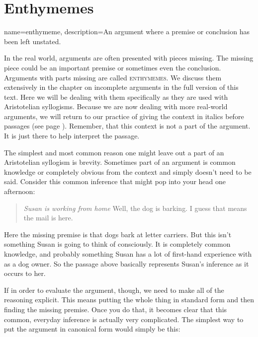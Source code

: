 \section{Enthymemes}

{
name=enthymeme,
description={An argument where a premise or conclusion has been left unstated.}
}


In the real world, arguments are often presented with pieces missing. The missing piece could be an important premise or sometimes even the conclusion.  Arguments with parts missing are called \textsc{\glspl{enthymeme}}. \label{def:enthymeme} We discuss them extensively in the chapter on incomplete arguments in the full version of this text. \label{ver_var}  Here we will be dealing with them specifically as they are used with Aristotelian syllogisms. Because we are now dealing with more real-world arguments, we will return to our practice of giving the context in italics before passages (see page \pageref{context_marker}). Remember, that this context is not a part of the argument. It is just there to help interpret the passage. 

The simplest and most common reason one might leave out a part of an Aristotelian syllogism is brevity. Sometimes part of an argument is common knowledge or completely obvious from the context and simply doesn't need to be said. Consider this common inference that might pop into your head one afternoon:

\begin{quotation} \noindent \textit{Susan is working from home} Well, the dog is barking. I guess that means the mail is here.\end{quotation}

Here the missing premise is that dogs bark at letter carriers. But this isn't something Susan is going to think of consciously. It is completely common knowledge, and probably something Susan has a lot of first-hand experience with as a dog owner. So the passage above basically represents Susan's inference as it occurs to her. 

If in order to evaluate the argument, though, we need to make all of the reasoning explicit. This means putting the whole thing in standard form and then finding the missing premise. Once you do that, it becomes clear that this common, everyday inference is actually very complicated. The simplest way to put the argument in canonical form would simply be this:

